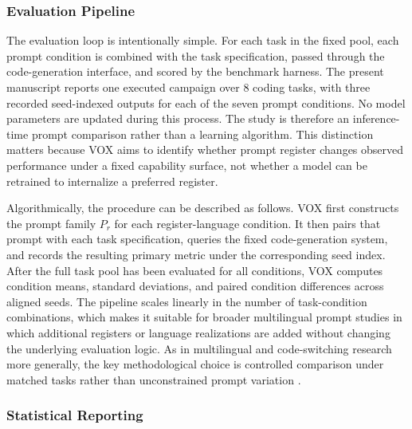 \documentclass{article}
\begin{document}
\subsubsection{Evaluation Pipeline}

\label{sec:evaluation_pipeline}

The evaluation loop is intentionally simple. For each task in the fixed pool, each prompt condition is combined with the task specification, passed through the code-generation interface, and scored by the benchmark harness. The present manuscript reports one executed campaign over 8 coding tasks, with three recorded seed-indexed outputs for each of the seven prompt conditions. No model parameters are updated during this process. The study is therefore an inference-time prompt comparison rather than a learning algorithm. This distinction matters because VOX aims to identify whether prompt register changes observed performance under a fixed capability surface, not whether a model can be retrained to internalize a preferred register.

Algorithmically, the procedure can be described as follows. VOX first constructs the prompt family \( P_r \) for each register-language condition. It then pairs that prompt with each task specification, queries the fixed code-generation system, and records the resulting primary metric under the corresponding seed index. After the full task pool has been evaluated for all conditions, VOX computes condition means, standard deviations, and paired condition differences across aligned seeds. The pipeline scales linearly in the number of task-condition combinations, which makes it suitable for broader multilingual prompt studies in which additional registers or language realizations are added without changing the underlying evaluation logic. As in multilingual and code-switching research more generally, the key methodological choice is controlled comparison under matched tasks rather than unconstrained prompt variation \cite{conneau2020emerging, qin2020cosdaml}.

\subsubsection{Statistical Reporting}

\label{sec:statistical_reporting}
\end{document}
